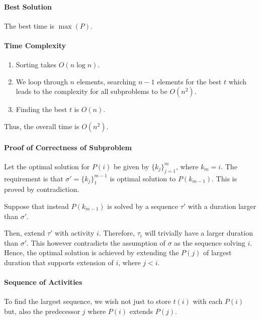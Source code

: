\paragraph{Best Solution}
The best time is \(\max(P)\).

\paragraph{Time Complexity}
\begin{enumerate}
  \item Sorting takes \(O(n \log n)\).
  \item We loop through \(n\) elements, searching  \(n - 1\) elements for the
    best  \(t\) which leads to the complexity for all subproblems
    to be \(O(n^2)\).
  \item Finding the best \(t\) is \(O(n)\).
\end{enumerate}
Thus, the overall time is \(O(n^2)\).

\paragraph{Proof of Correctness of Subproblem}
Let the optimal solution for \(P(i)\) be given by \( \{k_j\}_{j=1}^m \),
where \(k_m = i\).
The requirement is that \(\sigma' = \{k_j\}_{1}^{m - 1}\) is optimal solution
to \(P(k_{m - 1})\). This is proved by contradiction.

Suppose that instead \(P(k_{m - 1})\) is solved by a sequence
\(\tau'\) with a duration larger than  \(\sigma'\).

Then, extend \(\tau'\) with activity  \(i\). Therefore,
\(\tau_i\) will trivially have a larger duration than  \(\sigma'\).
This however contradicts the assumption of \(\sigma\) as the sequence
solving \(i\).
Hence, the optimal solution is achieved by extending the \(P(j)\) of largest duration
that supports extension of \(i\), where  \(j < i\).

\paragraph{Sequence of Activities}
To find the largest sequence, we wish not just to store \(t(i)\) with
each  \(P(i)\) but, also the predecessor \(j\) where \(P(i)\)
extends  \(P(j)\).


